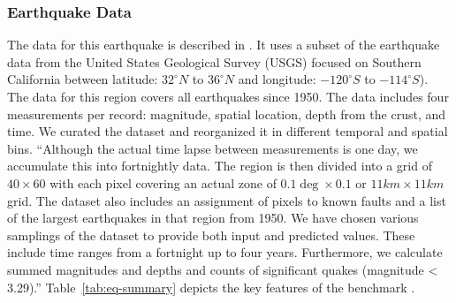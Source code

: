 \subsubsection{Earthquake Data}

The data for this earthquake is described in \citep{las-22-mlcommons-science}.  It uses a subset of the earthquake data from the United States Geological Survey (USGS) focused on Southern California between latitude: $32^\circ N$ to $36^\circ N$ and longitude: $-120^\circ S$ to $-114^\circ S$). The data for this region covers all earthquakes since 1950. The data includes four measurements per record: magnitude, spatial location, depth from the crust, and time. We curated the dataset and reorganized it in different temporal and spatial bins. ``Although the actual time lapse between measurements is one day, we accumulate this into fortnightly data. The region is then divided into a grid of $40 \times 60$ with each pixel covering an actual zone of $0.1\deg \times 0.1$ or $11km \times 11km$ grid. The dataset also includes an assignment of pixels to known faults and a list of the largest earthquakes in that region from 1950. We have chosen various samplings of the dataset to provide both input and predicted values. These include time ranges from a fortnight up to four years. Furthermore, we calculate summed magnitudes and depths and counts of significant quakes (magnitude < 3.29).''  Table~\ref{tab:eq-summary} depicts the key features of the benchmark \citep{las-22-mlcommons-science}.


